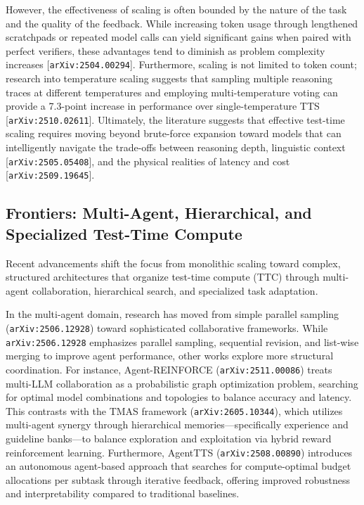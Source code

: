\documentclass[11pt]{article}
\begin{document}
However, the effectiveness of scaling is often bounded by the nature of the task and the quality of the feedback. While increasing token usage through lengthened scratchpads or repeated model calls can yield significant gains when paired with perfect verifiers, these advantages tend to diminish as problem complexity increases [\texttt{arXiv:2504.00294}]. Furthermore, scaling is not limited to token count; research into temperature scaling suggests that sampling multiple reasoning traces at different temperatures and employing multi-temperature voting can provide a 7.3-point increase in performance over single-temperature TTS [\texttt{arXiv:2510.02611}]. Ultimately, the literature suggests that effective test-time scaling requires moving beyond brute-force expansion toward models that can intelligently navigate the trade-offs between reasoning depth, linguistic context [\texttt{arXiv:2505.05408}], and the physical realities of latency and cost [\texttt{arXiv:2509.19645}].

\subsection{Frontiers: Multi-Agent, Hierarchical, and Specialized Test-Time Compute}

Recent advancements shift the focus from monolithic scaling toward complex, structured architectures that organize test-time compute (TTC) through multi-agent collaboration, hierarchical search, and specialized task adaptation.

In the multi-agent domain, research has moved from simple parallel sampling (\texttt{arXiv:2506.12928}) toward sophisticated collaborative frameworks. While \texttt{arXiv:2506.12928} emphasizes parallel sampling, sequential revision, and list-wise merging to improve agent performance, other works explore more structural coordination. For instance, Agent-REINFORCE (\texttt{arXiv:2511.00086}) treats multi-LLM collaboration as a probabilistic graph optimization problem, searching for optimal model combinations and topologies to balance accuracy and latency. This contrasts with the TMAS framework (\texttt{arXiv:2605.10344}), which utilizes multi-agent synergy through hierarchical memories—specifically experience and guideline banks—to balance exploration and exploitation via hybrid reward reinforcement learning. Furthermore, AgentTTS (\texttt{arXiv:2508.00890}) introduces an autonomous agent-based approach that searches for compute-optimal budget allocations per subtask through iterative feedback, offering improved robustness and interpretability compared to traditional baselines.
\end{document}
